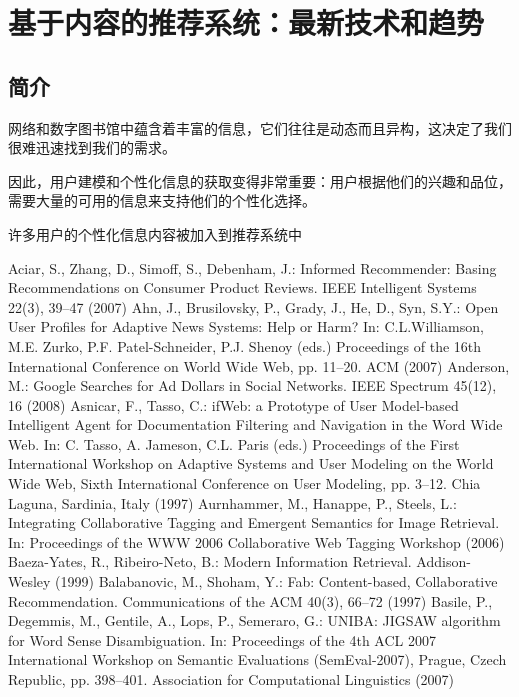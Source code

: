 \chapter{基于内容的推荐系统：最新技术和趋势}

\section{简介}
网络和数字图书馆中蕴含着丰富的信息，它们往往是动态而且异构，这决定了我们很难迅速找到我们的需求。

因此，用户建模和个性化信息的获取变得非常重要：用户根据他们的兴趣和品位，需要大量的可用的信息来支持他们的个性化选择。

许多用户的个性化信息内容被加入到推荐系统中


\begin{thebibliography}{99}
Aciar, S., Zhang, D., Simoff, S., Debenham, J.: Informed Recommender: Basing Recommendations on Consumer Product Reviews. IEEE Intelligent Systems 22(3), 39–47 (2007)
Ahn, J., Brusilovsky, P., Grady, J., He, D., Syn, S.Y.: Open User Profiles for Adaptive News Systems: Help or Harm? In: C.L.Williamson, M.E. Zurko, P.F. Patel-Schneider, P.J. Shenoy (eds.) Proceedings of the 16th International Conference on World Wide Web, pp. 11–20. ACM (2007)
Anderson, M.: Google Searches for Ad Dollars in Social Networks. IEEE Spectrum 45(12), 16 (2008)
Asnicar, F., Tasso, C.: ifWeb: a Prototype of User Model-based Intelligent Agent for Documentation Filtering and Navigation in the Word Wide Web. In: C. Tasso, A. Jameson, C.L. Paris (eds.) Proceedings of the First International Workshop on Adaptive Systems and User Modeling on the World Wide Web, Sixth International Conference on User Modeling, pp. 3–12. Chia Laguna, Sardinia, Italy (1997)
Aurnhammer, M., Hanappe, P., Steels, L.: Integrating Collaborative Tagging and Emergent Semantics for Image Retrieval. In: Proceedings of the WWW 2006 Collaborative Web Tagging Workshop (2006)
Baeza-Yates, R., Ribeiro-Neto, B.: Modern Information Retrieval. Addison-Wesley (1999)
Balabanovic, M., Shoham, Y.: Fab: Content-based, Collaborative Recommendation. Communications of the ACM 40(3), 66–72 (1997)
Basile, P., Degemmis, M., Gentile, A., Lops, P., Semeraro, G.: UNIBA: JIGSAW algorithm for Word Sense Disambiguation. In: Proceedings of the 4th ACL 2007 International Workshop on Semantic Evaluations (SemEval-2007), Prague, Czech Republic, pp. 398–401. Association for Computational Linguistics (2007)

\end{thebibliography}
